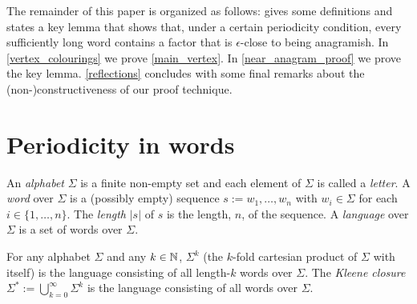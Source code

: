 \documentclass{patmorin}
\begin{document}
%
%



The remainder of this paper is organized as follows:  gives some definitions and states a key lemma that shows that, under a certain periodicity condition, every sufficiently long word contains a factor that is $\epsilon$-close to being anagramish.
In \cref{vertex_colourings} we prove \cref{main_vertex}.  In \cref{near_anagram_proof} we prove the key lemma. \cref{reflections} concludes with some final remarks about the (non-)constructiveness of our proof technique.

\section{Periodicity in words}
\label{near_anagram_statement}

An \emph{alphabet} $\Sigma$ is a finite non-empty set and each element of $\Sigma$ is called a \emph{letter}. A \emph{word} over $\Sigma$ is a (possibly empty) sequence $s:=w_1,\ldots,w_n$ with $w_i\in\Sigma$ for each $i\in\{1,\ldots,n\}$. The \emph{length} $|s|$ of $s$ is the length, $n$, of the sequence.  A \emph{language} over $\Sigma$ is a set of words over $\Sigma$.

For any alphabet $\Sigma$ and any $k\in\mathbb{N}$, $\Sigma^k$ (the $k$-fold cartesian product of $\Sigma$ with itself) is the language consisting of all length-$k$ words over $\Sigma$.  The \emph{Kleene closure} $\Sigma^*:=\bigcup_{k=0}^\infty \Sigma^k$ is the language consisting of all words over $\Sigma$.

\end{document}
